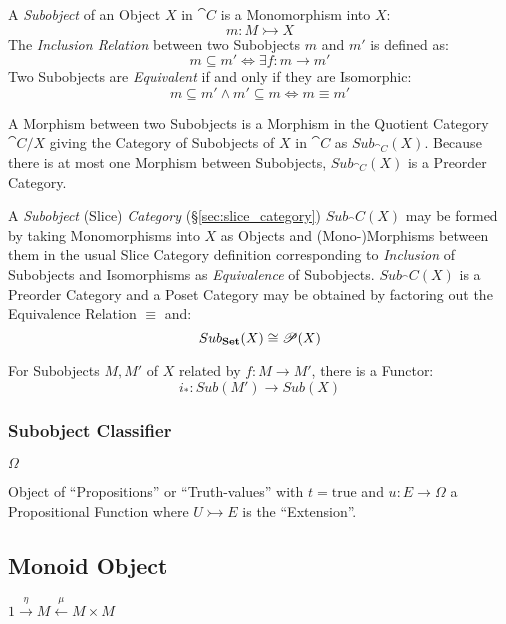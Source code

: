A \emph{Subobject} of an Object $X$ in $\cat{C}$ is a Monomorphism
into $X$:
\[
  m : M \rightarrowtail X
\]
The \emph{Inclusion Relation} between two Subobjects $m$ and $m'$ is
defined as:
\[
  m \subseteq m' \Leftrightarrow \exists f : m \rightarrow m'
\]
Two Subobjects are \emph{Equivalent} if and only if they are
Isomorphic:
\[
  m \subseteq m' \wedge m' \subseteq m \Leftrightarrow m \equiv m'
\]

A Morphism between two Subobjects is a Morphism in the Quotient
Category $\cat{C}/X$ giving the Category of Subobjects of $X$ in
$\cat{C}$ as $Sub_{\cat{C}}(X)$. Because there is at most one
Morphism between Subobjects, $Sub_{\cat{C}}(X)$ is a Preorder
Category.

A \emph{Subobject} (Slice) \emph{Category}
(\S\ref{sec:slice_category}) $Sub_\cat{C}(X)$ may be formed by
taking Monomorphisms into $X$ as Objects and (Mono-)Morphisms between
them in the usual Slice Category definition corresponding to
\emph{Inclusion} of Subobjects and Isomorphisms as \emph{Equivalence}
of Subobjects. $Sub_\cat{C}(X)$ is a Preorder Category and a Poset
Category may be obtained by factoring out the Equivalence Relation
$\equiv$ and:
\[
  Sub_\mathbf{Set}(X) \cong \mathscr{P}(X)
\]

For Subobjects $M,M'$ of $X$ related by $f : M \rightarrow M'$, there
is a Functor:
\[
  i_* : Sub (M') \rightarrow Sub (X)
\]



\subsubsection{Subobject Classifier}\label{sec:subobject_classifier}

$\Omega$

Object of ``Propositions'' or ``Truth-values'' with $t =
\mathrm{true}$ and $u : E \rightarrow \Omega$ a Propositional Function
where $U \rightarrowtail E$ is the ``Extension''.



\subsection{Monoid Object}\label{sec:monoid_object}

$1 \xrightarrow{\eta} M \xleftarrow{\mu} M \times M$



